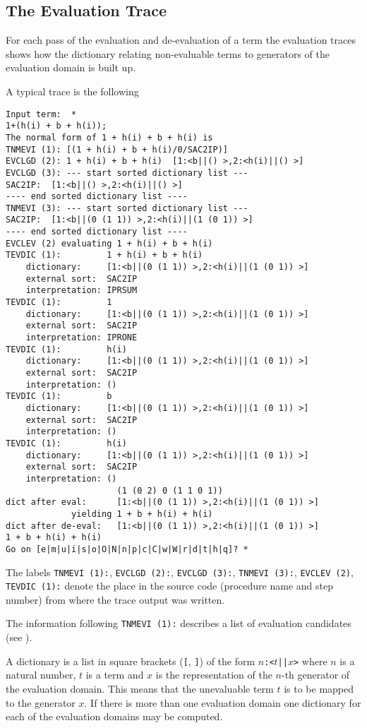 \subsection{The Evaluation Trace}

For each pass of the evaluation and de-evaluation of a term the evaluation 
traces shows how the dictionary relating non-evaluable terms to generators
of the evaluation domain is built up.

A typical trace is the following
\begin{verbatim}
Input term:  *
1+(h(i) + b + h(i));
The normal form of 1 + h(i) + b + h(i) is 
TNMEVI (1): [(1 + h(i) + b + h(i)/0/SAC2IP)]
EVCLGD (2): 1 + h(i) + b + h(i)  [1:<b||() >,2:<h(i)||() >]
EVCLGD (3): --- start sorted dictionary list ---
SAC2IP:  [1:<b||() >,2:<h(i)||() >]
---- end sorted dictionary list ----
TNMEVI (3): --- start sorted dictionary list ---
SAC2IP:  [1:<b||(0 (1 1)) >,2:<h(i)||(1 (0 1)) >]
---- end sorted dictionary list ----
EVCLEV (2) evaluating 1 + h(i) + b + h(i)
TEVDIC (1):         1 + h(i) + b + h(i)
    dictionary:     [1:<b||(0 (1 1)) >,2:<h(i)||(1 (0 1)) >]
    external sort:  SAC2IP
    interpretation: IPRSUM 
TEVDIC (1):         1
    dictionary:     [1:<b||(0 (1 1)) >,2:<h(i)||(1 (0 1)) >]
    external sort:  SAC2IP
    interpretation: IPRONE 
TEVDIC (1):         h(i)
    dictionary:     [1:<b||(0 (1 1)) >,2:<h(i)||(1 (0 1)) >]
    external sort:  SAC2IP
    interpretation: () 
TEVDIC (1):         b
    dictionary:     [1:<b||(0 (1 1)) >,2:<h(i)||(1 (0 1)) >]
    external sort:  SAC2IP
    interpretation: () 
TEVDIC (1):         h(i)
    dictionary:     [1:<b||(0 (1 1)) >,2:<h(i)||(1 (0 1)) >]
    external sort:  SAC2IP
    interpretation: () 
                      (1 (0 2) 0 (1 1 0 1)) 
dict after eval:      [1:<b||(0 (1 1)) >,2:<h(i)||(1 (0 1)) >]
             yielding 1 + b + h(i) + h(i)
dict after de-eval:   [1:<b||(0 (1 1)) >,2:<h(i)||(1 (0 1)) >]
1 + b + h(i) + h(i)
Go on [e|m|u|i|s|o|O|N|n|p|c|C|w|W|r|d|t|h|q]? * 
\end{verbatim}
The labels \texttt{TNMEVI (1):}, \texttt{EVCLGD (2):}, \texttt{EVCLGD (3):},
\texttt{TNMEVI (3):}, \texttt{EVCLEV (2)}, \texttt{TEVDIC (1):} denote
the place in the source code (procedure name and step number)
from where the trace output was written.

The information following \texttt{TNMEVI (1):} describes a list
of evaluation candidates (see \RUD).

A dictionary is a list in square brackets (\texttt{[}, \texttt{]})
of the form $n$\texttt{:<}$t$\texttt{||}$x$\texttt{>}
where $n$ is a natural number, $t$ is a term and $x$ is the  
representation of the $n$-th generator of the evaluation domain.
This means that the unevaluable term $t$ is to be mapped to the generator $x$.
If there is more than one evaluation domain one dictionary for each of the
evaluation domains may be computed.

